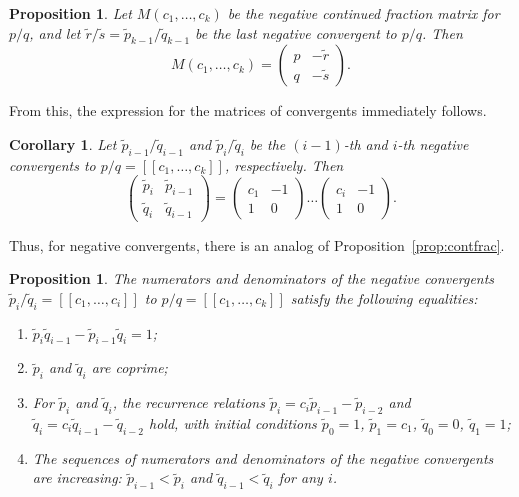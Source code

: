 \documentclass[a4paper,11pt]{amsart}
\theoremstyle{plain}
\newtheorem{prop}[theorem]{Proposition}
\newtheorem{corollary}[theorem]{Corollary}
\theoremstyle{remark}
\theoremstyle{definition}
\numberwithin{equation}{section}
\numberwithin{figure}{section}
\begin{document}
\begin{prop}\label{prop:matrixneg} Let $M(c_1, \dots, c_k)$ be the negative continued fraction matrix for $p/q$, and let $\tilde{r}/\tilde{s} = \tilde{p}_{k-1}/\tilde{q}_{k-1}$ be the last negative convergent to $p/q$. Then
\[
M(c_1, \dots, c_k) = \begin{pmatrix}p & -\tilde{r}\\q & -\tilde{s}
\end{pmatrix}.
\]
\end{prop}

From this, the expression for the matrices of convergents immediately follows.

\begin{corollary}
Let $\tilde{p}_{i-1}/\tilde{q}_{i-1}$ and $\tilde{p}_i/\tilde{q}_i$ be the $(i-1)$-th and $i$-th negative convergents to $p/q = [[c_1, \dots, c_k]]$, respectively. Then
\begin{equation}\label{eq:negcontdecomp}
\begin{pmatrix}\tilde{p}_i & \tilde{p}_{i-1}\\\tilde{q}_i & \tilde{q}_{i-1}
\end{pmatrix}=
\begin{pmatrix}c_1 & -1\\1 & 0
\end{pmatrix}
\dots 
\begin{pmatrix}c_i & -1\\1 & 0
\end{pmatrix}.
\end{equation}
\end{corollary}

Thus, for negative convergents, there is an analog of Proposition~\ref{prop:contfrac}.

\begin{prop}\label{prop:negcontfrac}
The numerators and denominators of the negative convergents $\tilde{p}_i/\tilde{q}_i = [[c_1, \dots, c_i]]$ to $p/q = [[c_1, \dots, c_k]]$ satisfy the following equalities:

\begin{enumerate}
\item $\tilde{p}_i \tilde{q}_{i-1} - \tilde{p}_{i-1} \tilde{q}_i = 1$;
\item $\tilde{p}_i$ and $\tilde{q}_i$ are coprime;
\item For $\tilde{p}_i$ and $\tilde{q}_i$, the recurrence relations $\tilde{p}_i = c_i \tilde{p}_{i-1} - \tilde{p}_{i-2}$ and $\tilde{q}_i = c_i \tilde{q}_{i-1} - \tilde{q}_{i-2}$ hold, with initial conditions $\tilde{p}_0 = 1$, $\tilde{p}_1 = c_1$, $\tilde{q}_0 = 0$, $\tilde{q}_1 = 1$;
\item The sequences of numerators and denominators of the negative convergents are increasing: $\tilde{p}_{i-1} < \tilde{p}_i$ and $\tilde{q}_{i-1} < \tilde{q}_i$ for any $i$.
\end{enumerate}
\end{prop}
\end{document}
